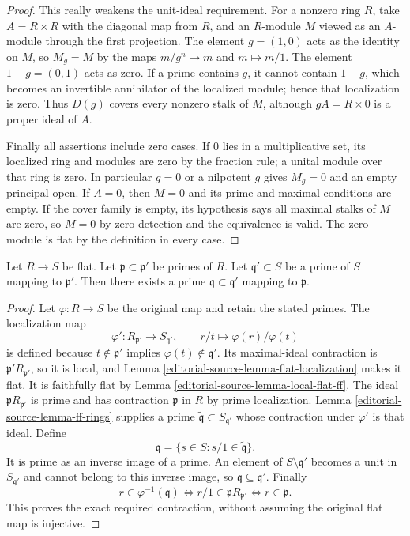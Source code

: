 \begin{proof}
This really weakens the unit-ideal requirement. For a
nonzero ring $R$, take $A=R\times R$ with the diagonal
map from $R$, and an $R$-module $M$ viewed as an $A$-module
through the first projection. The element $g=(1,0)$ acts
as the identity on $M$, so $M_g=M$ by the maps
$m/g^n\mapsto m$ and $m\mapsto m/1$.
The element $1-g=(0,1)$ acts as zero. If a prime contains
$g$, it cannot contain $1-g$, which becomes an invertible
annihilator of the localized module; hence that localization
is zero. Thus $D(g)$ covers every nonzero stalk of $M$,
although $gA=R\times0$ is a proper ideal of $A$.

Finally all assertions include zero cases. If $0$ lies
in a multiplicative set, its localized ring and modules
are zero by the fraction rule; a unital module over that
ring is zero. In particular $g=0$ or a nilpotent $g$ gives
$M_g=0$ and an empty principal open. If $A=0$, then $M=0$
and its prime and maximal conditions are empty. If the
cover family is empty, its hypothesis says all maximal
stalks of $M$ are zero, so $M=0$ by zero detection and the
equivalence is valid. The zero module is flat by the
definition in every case.
\end{proof}

\begin{lemma}
\label{editorial-source-lemma-flat-going-down}
Let $R \to S$ be flat. Let $\mathfrak p \subset \mathfrak p'$
be primes of $R$. Let $\mathfrak q' \subset S$ be a prime of $S$
mapping to $\mathfrak p'$. Then there exists a prime
$\mathfrak q \subset \mathfrak q'$ mapping to $\mathfrak p$.
\end{lemma}

\begin{proof}
Let $\varphi:R\to S$ be the original map and retain the
stated primes. The localization map
$$
\varphi':R_{\mathfrak p'}\longrightarrow S_{\mathfrak q'},
\qquad r/t\longmapsto\varphi(r)/\varphi(t)
$$
is defined because $t\notin\mathfrak p'$ implies
$\varphi(t)\notin\mathfrak q'$. Its maximal-ideal
contraction is $\mathfrak p'R_{\mathfrak p'}$, so it is
local, and Lemma \ref{editorial-source-lemma-flat-localization} makes it
flat. It is faithfully flat by Lemma \ref{editorial-source-lemma-local-flat-ff}.
The ideal $\mathfrak pR_{\mathfrak p'}$ is prime and has
contraction $\mathfrak p$ in $R$ by prime localization.
Lemma \ref{editorial-source-lemma-ff-rings} supplies a prime
$\widetilde{\mathfrak q}\subset S_{\mathfrak q'}$ whose
contraction under $\varphi'$ is that ideal. Define
$$
\mathfrak q=\{s\in S:s/1\in\widetilde{\mathfrak q}\}.
$$
It is prime as an inverse image of a prime. An element of
$S\setminus\mathfrak q'$ becomes a unit in $S_{\mathfrak q'}$
and cannot belong to this inverse image, so
$\mathfrak q\subseteq\mathfrak q'$. Finally
$$
r\in\varphi^{-1}(\mathfrak q)
\Longleftrightarrow
r/1\in\mathfrak pR_{\mathfrak p'}
\Longleftrightarrow r\in\mathfrak p.
$$
This proves the exact required contraction, without
assuming the original flat map is injective.
\end{proof}

